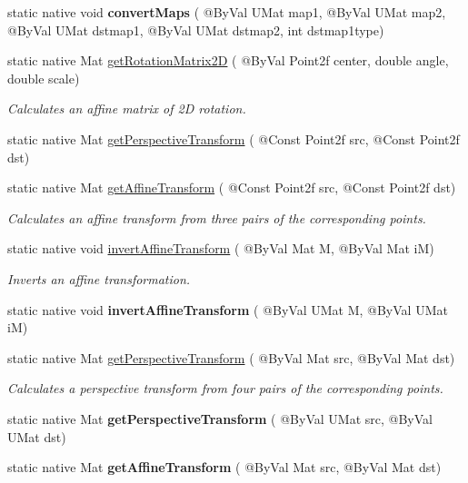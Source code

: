 \begin{DoxyCompactItemize}
\item 
static native void {\bfseries convert\+Maps} ( @By\+Val U\+Mat map1, @By\+Val U\+Mat map2, @By\+Val U\+Mat dstmap1, @By\+Val U\+Mat dstmap2, int dstmap1type)
\item 
static native Mat \hyperlink{group__imgproc__transform_gab3d97da00a90c299d2899587dc60c4cd}{get\+Rotation\+Matrix2D} ( @By\+Val Point2f center, double angle, double scale)
\begin{DoxyCompactList}\small\item\em Calculates an affine matrix of 2D rotation. \end{DoxyCompactList}\item 
static native Mat \hyperlink{group__imgproc__transform_ga9c65e08c8634d7f7d24ab403dac41b26}{get\+Perspective\+Transform} ( @Const Point2f src, @Const Point2f dst)
\item 
static native Mat \hyperlink{group__imgproc__transform_ga6aff4eb184828799fb795a52309aa8e6}{get\+Affine\+Transform} ( @Const Point2f src, @Const Point2f dst)
\begin{DoxyCompactList}\small\item\em Calculates an affine transform from three pairs of the corresponding points. \end{DoxyCompactList}\item 
static native void \hyperlink{group__imgproc__transform_ga4905a785b488db4f1dbb485efa98356c}{invert\+Affine\+Transform} ( @By\+Val Mat M, @By\+Val Mat iM)
\begin{DoxyCompactList}\small\item\em Inverts an affine transformation. \end{DoxyCompactList}\item 
static native void {\bfseries invert\+Affine\+Transform} ( @By\+Val U\+Mat M, @By\+Val U\+Mat iM)
\item 
static native Mat \hyperlink{group__imgproc__transform_gaf64ca469bb365e0b906e40ecde6eefe5}{get\+Perspective\+Transform} ( @By\+Val Mat src, @By\+Val Mat dst)
\begin{DoxyCompactList}\small\item\em Calculates a perspective transform from four pairs of the corresponding points. \end{DoxyCompactList}\item 
static native Mat {\bfseries get\+Perspective\+Transform} ( @By\+Val U\+Mat src, @By\+Val U\+Mat dst)
\item 
static native Mat {\bfseries get\+Affine\+Transform} ( @By\+Val Mat src, @By\+Val Mat dst)

\end{DoxyCompactItemize}

